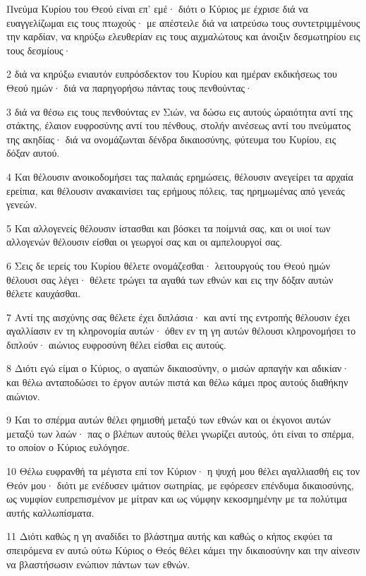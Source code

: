 \par Πνεύμα Κυρίου του Θεού είναι επ' εμέ· διότι ο Κύριος με έχρισε διά να ευαγγελίζωμαι εις τους πτωχούς· με απέστειλε διά να ιατρεύσω τους συντετριμμένους την καρδίαν, να κηρύξω ελευθερίαν εις τους αιχμαλώτους και άνοιξιν δεσμωτηρίου εις τους δεσμίους·
\par 2 διά να κηρύξω ενιαυτόν ευπρόσδεκτον του Κυρίου και ημέραν εκδικήσεως του Θεού ημών· διά να παρηγορήσω πάντας τους πενθούντας·
\par 3 διά να θέσω εις τους πενθούντας εν Σιών, να δώσω εις αυτούς ώραιότητα αντί της στάκτης, έλαιον ευφροσύνης αντί του πένθους, στολήν αινέσεως αντί του πνεύματος της ακηδίας· διά να ονομάζωνται δένδρα δικαιοσύνης, φύτευμα του Κυρίου, εις δόξαν αυτού.
\par 4 Και θέλουσιν ανοικοδομήσει τας παλαιάς ερημώσεις, θέλουσιν ανεγείρει τα αρχαία ερείπια, και θέλουσιν ανακαινίσει τας ερήμους πόλεις, τας ηρημωμένας από γενεάς γενεών.
\par 5 Και αλλογενείς θέλουσιν ίστασθαι και βόσκει τα ποίμνιά σας, και οι υιοί των αλλογενών θέλουσιν είσθαι οι γεωργοί σας και οι αμπελουργοί σας.
\par 6 Σεις δε ιερείς του Κυρίου θέλετε ονομάζεσθαι· λειτουργούς του Θεού ημών θέλουσι σας λέγει· θέλετε τρώγει τα αγαθά των εθνών και εις την δόξαν αυτών θέλετε καυχάσθαι.
\par 7 Αντί της αισχύνης σας θέλετε έχει διπλάσια· και αντί της εντροπής θέλουσιν έχει αγαλλίασιν εν τη κληρονομία αυτών· όθεν εν τη γη αυτών θέλουσι κληρονομήσει το διπλούν· αιώνιος ευφροσύνη θέλει είσθαι εις αυτούς.
\par 8 Διότι εγώ είμαι ο Κύριος, ο αγαπών δικαιοσύνην, ο μισών αρπαγήν και αδικίαν· και θέλω ανταποδώσει το έργον αυτών πιστά και θέλω κάμει προς αυτούς διαθήκην αιώνιον.
\par 9 Και το σπέρμα αυτών θέλει φημισθή μεταξύ των εθνών και οι έκγονοι αυτών μεταξύ των λαών· πας ο βλέπων αυτούς θέλει γνωρίζει αυτούς, ότι είναι το σπέρμα, το οποίον ο Κύριος ευλόγησε.
\par 10 Θέλω ευφρανθή τα μέγιστα επί τον Κύριον· η ψυχή μου θέλει αγαλλιασθή εις τον Θεόν μου· διότι με ενέδυσεν ιμάτιον σωτηρίας, με εφόρεσεν επένδυμα δικαιοσύνης, ως νυμφίον ευπρεπισμένον με μίτραν και ως νύμφην κεκοσμημένην με τα πολύτιμα αυτής καλλωπίσματα.
\par 11 Διότι καθώς η γη αναδίδει το βλάστημα αυτής και καθώς ο κήπος εκφύει τα σπειρόμενα εν αυτώ ούτω Κύριος ο Θεός θέλει κάμει την δικαιοσύνην και την αίνεσιν να βλαστήσωσιν ενώπιον πάντων των εθνών.

